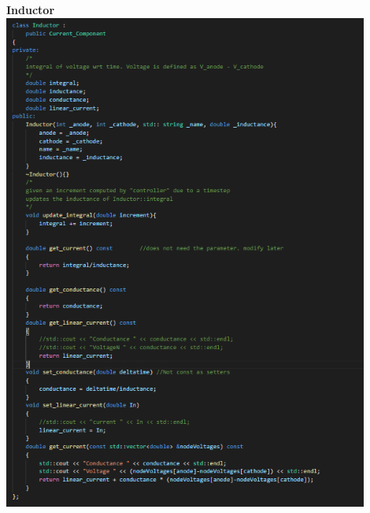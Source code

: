 \documentclass{article}
\begin{document}
\bigbreak
\newpage
\textbf{Inductor}
\bigbreak
\includegraphics[width=12cm]{images/INDUCTOR.PNG}
\bigbreak
\end{document}
